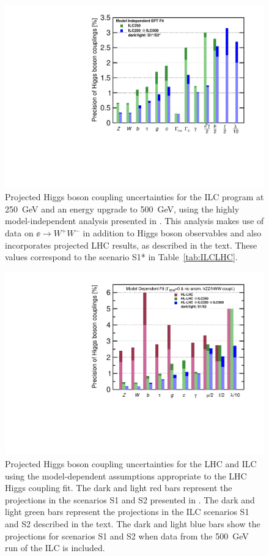\begin{figure}
\begin{center}
\includegraphics[width=0.85\hsize]{chapters/figures/ModelindepSummary.pdf}
\caption{Projected Higgs boson coupling uncertainties for the ILC
  program at 250~GeV and an energy upgrade to 500~GeV, using the
  highly model-independent analysis presented in \cite{Fujii:2017vwa}. This
  analysis makes use of  data on $\ee\to W^+W^-$ in addition to Higgs
  boson observables and also incorporates projected LHC results, as described
  in the text.  These
values correspond to the  scenario S1* in Table~\ref{tab:ILCLHC}.}
\label{fig:ILCmodelindep}
\end{center}
\end{figure}
\begin{figure}
\begin{center}
\includegraphics[width=0.85\hsize]{chapters/figures/ModeldepSummary.pdf}
\caption{Projected Higgs boson coupling uncertainties for the LHC and
  ILC
using the model-dependent assumptions appropriate to the LHC Higgs
coupling fit.   The
dark and light red bars represent the projections in the scenarios S1
and S2 presented in  \cite{YR}.    The dark and light green bars represent the
projections in the ILC scenarios S1 and S2 described in the
text.  The dark and light blue bars show the projections for scenarios S1 and S2
when
data from the 500~GeV run of the ILC is included.}
 \label{fig:ILCLHC}
\end{center}
\end{figure}



